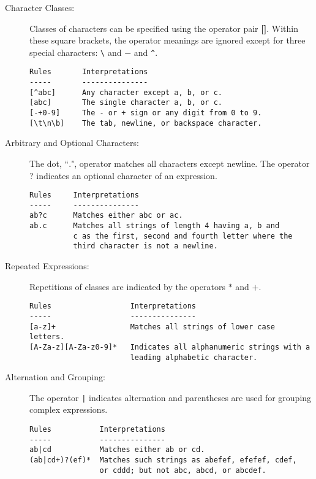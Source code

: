 \begin{description}
  \item[Character Classes:]  Classes of characters can be specified using
      the  operator pair {\bf []}.  Within these square brackets, the operator
      meanings are ignored except for three special characters:  \verb|\|
      and $-$ and \verb|^|.

\small
\begin{verbatim}
Rules       Interpretations
-----       ---------------
[^abc]      Any character except a, b, or c.
[abc]       The single character a, b, or c.
[-+0-9]     The - or + sign or any digit from 0 to 9.
[\t\n\b]    The tab, newline, or backspace character.
\end{verbatim}
\normalsize

  \item[Arbitrary and Optional Characters:]  The dot, ``$.$", operator 
  matches all characters except newline.  The  operator  ?  indicates  an
  optional character of an expression.

\small
\begin{verbatim}
Rules     Interpretations
-----     ---------------
ab?c      Matches either abc or ac.
ab.c      Matches all strings of length 4 having a, b and
          c as the first, second and fourth letter where the
          third character is not a newline.
\end{verbatim}
\normalsize


  \item[Repeated Expressions:]  Repetitions of classes are  indicated  by
      the operators $*$ and $+$.

\small
\begin{verbatim}
Rules                  Interpretations
-----                  ---------------
[a-z]+                 Matches all strings of lower case letters.
[A-Za-z][A-Za-z0-9]*   Indicates all alphanumeric strings with a
                       leading alphabetic character.
\end{verbatim}
\normalsize


  \item[Alternation and Grouping:]  The operator \verb"|" indicates  alternation
      and parentheses are used for grouping complex expressions.

\small
\begin{verbatim}
Rules           Interpretations
-----           ---------------
ab|cd           Matches either ab or cd.
(ab|cd+)?(ef)*  Matches such strings as abefef, efefef, cdef,
                or cddd; but not abc, abcd, or abcdef.
\end{verbatim}
\normalsize



\end{description}
